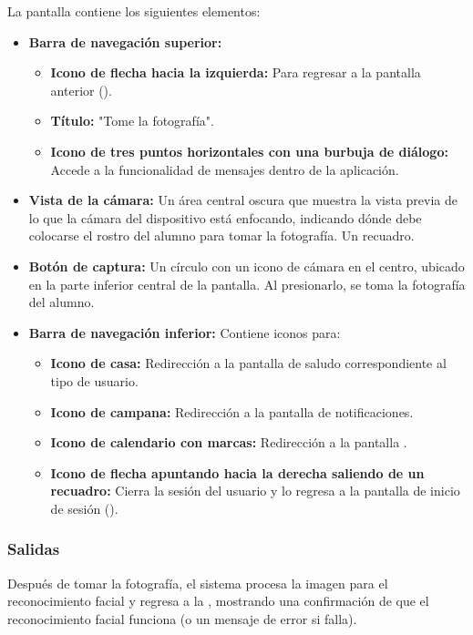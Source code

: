 La pantalla contiene los siguientes elementos:
\begin{itemize}
	\item \textbf{Barra de navegación superior:}
	\begin{itemize}
		\item \textbf{Icono de flecha hacia la izquierda:} Para regresar a la pantalla anterior ().
		\item \textbf{Título:} "Tome la fotografía".
		\item \textbf{Icono de tres puntos horizontales con una burbuja de diálogo:} Accede a la funcionalidad de mensajes dentro de la aplicación.
	\end{itemize}
	\item \textbf{Vista de la cámara:} Un área central oscura que muestra la vista previa de lo que la cámara del dispositivo está enfocando, indicando dónde debe colocarse el rostro del alumno para tomar la fotografía. Un recuadro.
	\item \textbf{Botón de captura:} Un círculo con un icono de cámara en el centro, ubicado en la parte inferior central de la pantalla. Al presionarlo, se toma la fotografía del alumno.
	\item \textbf{Barra de navegación inferior:} Contiene iconos para:
	\begin{itemize}
		\item \textbf{Icono de casa:} Redirección a la pantalla de saludo correspondiente al tipo de usuario.
		\item \textbf{Icono de campana:} Redirección a la pantalla de notificaciones.
		\item \textbf{Icono de calendario con marcas:} Redirección a la pantalla .
		\item \textbf{Icono de flecha apuntando hacia la derecha saliendo de un recuadro:} Cierra la sesión del usuario y lo regresa a la pantalla de inicio de sesión ().
	\end{itemize}
\end{itemize}

\subsubsection{Salidas}
Después de tomar la fotografía, el sistema procesa la imagen para el reconocimiento facial y regresa a la , mostrando una confirmación de que el reconocimiento facial funciona (o un mensaje de error si falla).

